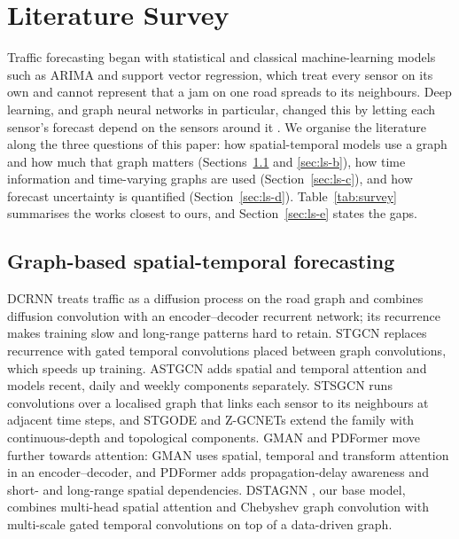 \documentclass[conference]{IEEEtran}
\begin{document}
\section{Literature Survey}\label{sec:related}
Traffic forecasting began with statistical and classical machine-learning models such as ARIMA and support vector regression, which treat every sensor on its own and cannot represent that a jam on one road spreads to its neighbours. Deep learning, and graph neural networks in particular, changed this by letting each sensor's forecast depend on the sensors around it \cite{li2017dcrnn,yu2017stgcn}. We organise the literature along the three questions of this paper: how spatial-temporal models use a graph and how much that graph matters (Sections~\ref{sec:ls-a} and \ref{sec:ls-b}), how time information and time-varying graphs are used (Section~\ref{sec:ls-c}), and how forecast uncertainty is quantified (Section~\ref{sec:ls-d}). Table~\ref{tab:survey} summarises the works closest to ours, and Section~\ref{sec:ls-e} states the gaps.

\subsection{Graph-based spatial-temporal forecasting}\label{sec:ls-a}
DCRNN \cite{li2017dcrnn} treats traffic as a diffusion process on the road graph and combines diffusion convolution with an encoder--decoder recurrent network; its recurrence makes training slow and long-range patterns hard to retain. STGCN \cite{yu2017stgcn} replaces recurrence with gated temporal convolutions placed between graph convolutions, which speeds up training. ASTGCN \cite{guo2019astgcn} adds spatial and temporal attention and models recent, daily and weekly components separately. STSGCN \cite{song2020stsgcn} runs convolutions over a localised graph that links each sensor to its neighbours at adjacent time steps, and STGODE \cite{fang2021stgode} and Z-GCNETs \cite{chen2021zgcnets} extend the family with continuous-depth and topological components. GMAN \cite{zheng2020gman} and PDFormer \cite{jiang2023pdformer} move further towards attention: GMAN uses spatial, temporal and transform attention in an encoder--decoder, and PDFormer adds propagation-delay awareness and short- and long-range spatial dependencies. DSTAGNN \cite{lan2022dstagnn}, our base model, combines multi-head spatial attention and Chebyshev graph convolution with multi-scale gated temporal convolutions on top of a data-driven graph.
\end{document}
